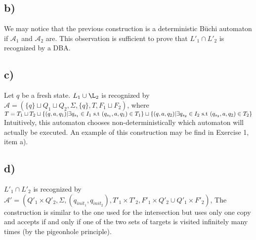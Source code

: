 \documentclass{article}
\newcommand{\A}{\mathcal{A}}
\begin{document}
\subsection*{b)}

We may notice that the previous construction is a deterministic Büchi automaton if $\A_1$ and $\A_2$ are.
This observation is sufficient to prove that $L'_1 \cap L'_2$ is recognized by a DBA.

\subsection*{c)}

Let $q$ be a fresh state.\newline
$L_1 \cup \L_2$ is recognized by $\A = (\{q\} \sqcup Q_1 \sqcup Q_2,\Sigma,\{q\},T,F_1 \sqcup F_2)$, \newline
where $T = T_1 \sqcup T_2 \sqcup \{(q,a,q_1) \vert \exists q_{s_1} \in I_1 \text{ s.t } (q_{s_1},a,q_1) \in T_1\} \sqcup \newline
\{(q,a,q_2) \vert \exists q_{s_2} \in I_2 \text{ s.t } (q_{s_2},a,q_2) \in T_2\}$ \newline
Intuitively, this automaton chooses non-deterministically which automaton will actually be executed.\newline
An example of this construction may be find in Exercise 1, item a).

\subsection*{d)} 

$L'_1 \cap L'_2$ is recognized by $\A' = (Q'_1 \times Q'_2,\Sigma,(q_{init_1},q_{init_2}),T'_1 \times T'_2,F'_1 \times Q'_2 \cup Q'_1 \times F'_2)$, \newline
The construction is similar to the one used for the intersection but uses only one copy and accepts if and only if one of the two sets of targets is visited infinitely many times (by the pigeonhole principle).

\newpage
\end{document}
